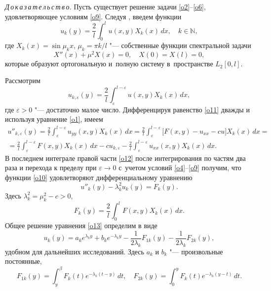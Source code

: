 \smallskip

\textit{Д\,о\,к\,а\,з\,а\,т\,е\,л\,ь\,с\,т\,в\,о.} 
Пусть существует решение задачи \eqref{o2}--\eqref{o6}, удовлетворяющее условиям \eqref{o9}. 
Следуя \cite{sab:3}, введем  функции
\begin{equation}\label{o10}
u_k(y)=\frac{2}{l}\int _{0}^{l} u(x,y)X_k(x)\,dx, \quad k\in\mathbb{N},
\end{equation}
где $X_k(x)=\sin\mu_kx$, $\mu_k=\pi k/l$ "--- собственные функции спектральной задачи
$$
X''(x)+\mu^2X(x)=0,\quad  X(0)=X(l)=0,
$$
которые образуют ортогональную и~полную систему в~пространстве $L_2[0,l]$.

Рассмотрим
\begin{equation}\label{o11}
u_{k,\varepsilon}(y)=\frac{2}{l}\int _{\varepsilon}^{l-\varepsilon} u(x,y)X_k(x)\,dx,
\end{equation}
где $\varepsilon>0$ "--- достаточно малое число. 
Дифференцируя равенство \eqref{o11} дважды и используя уравнение \eqref{o1}, имеем
\begin{multline}
u''_{k,\varepsilon}(y)=\frac{2}{l}\int _{\varepsilon}^{l-\varepsilon} u_{yy}(x,y)X_k(x)\,dx= \frac{2}{l}\int _{\varepsilon}^{l-\varepsilon} \bigl[F(x,y)-u_{xx}-cu\bigr]X_k(x)\,dx=
\\
\label{o12}
=\frac{2}{l}\int _{\varepsilon}^{l-\varepsilon} F(x,y)X_k(x)\,dx-cu_{k,\varepsilon}-\frac{2}{l}\int _{\varepsilon}^{l-\varepsilon} u_{xx}(x,y)X_k(x)\,dx.
\end{multline}
В последнем интеграле правой части \eqref{o12} после интегрирования по частям два раза и перехода к пределу при $\varepsilon\rightarrow0$ с~учетом условий \eqref{o4}--\eqref{o9} получим, что функции \eqref{o10} удовлетворяют дифференциальному уравнению
\begin{equation}\label{o13}
u''_k(y)-\lambda^2_ku_k(y)=F_k(y).
\end{equation}
Здесь $\lambda^2_k=\mu^2_k-c>0$,
\begin{equation}\label{o14}
F_k(y)=\frac{2}{l}\int _{0}^{l} F(x,y)X_k(x)\,dx.
\end{equation}
Общее решение уравнения \eqref{o13} определим в виде
\begin{equation}\label{o15}
u_k(y)=a_ke^{\lambda_ky}+b_ke^{-\lambda_ky}-\frac{1}{2\lambda_k}F_{1k}(y)-\frac{1}{2\lambda_k}F_{2k}(y),
\end{equation}
удобном для дальнейших исследований. Здесь $a_k$ и $b_k$ "--- произвольные постоянные,
$$
F_{1k}(y)=\int _{y}^{\beta} F_k(t)e^{-\lambda_k(t-y)}\,dt,\quad  
F_{2k}(y)=\int _{0}^{y} F_k(t)e^{-\lambda_k(y-t)}\,dt.
$$

